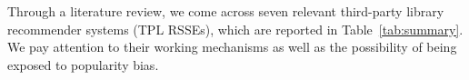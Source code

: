 











Through a literature review, we come across seven relevant third-party library recommender systems (TPL RSSEs), which are reported in %
Table~\ref{tab:summary}. We pay attention to their working mechanisms as well as the possibility of being exposed to popularity bias. 

